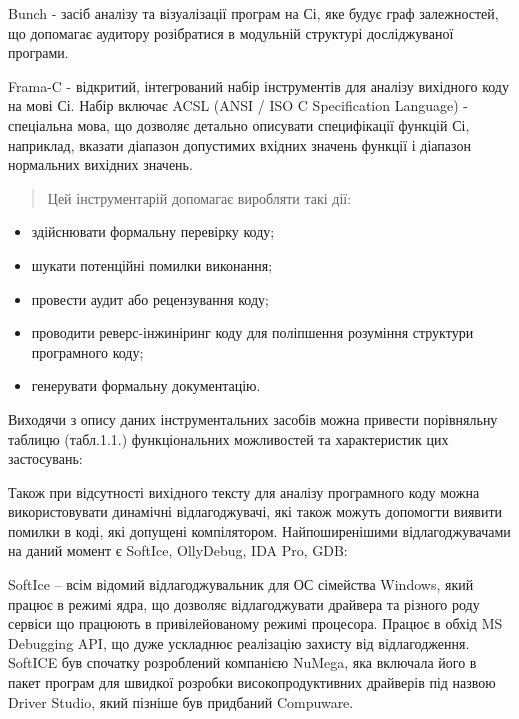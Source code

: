 Bunch - засіб аналізу та візуалізації програм на Сі, яке будує граф залежностей, що допомагає аудитору розібратися в модульній структурі досліджуваної програми.

Frama-C - відкритий, інтегрований набір інструментів для аналізу вихідного коду на мові Сі. Набір включає ACSL (ANSI / ISO C Specification Language) - спеціальна мова, що дозволяє детально описувати специфікації функцій Сі, наприклад, вказати діапазон допустимих вхідних значень функції і діапазон нормальних вихідних значень.
\begin{quote}

Цей інструментарій допомагає виробляти такі дії:
\end{quote}
\begin{itemize}
\item {} 
здійснювати формальну перевірку коду;

\item {} 
шукати потенційні помилки виконання;

\item {} 
провести аудит або рецензування коду;

\item {} 
проводити реверс-інжиніринг коду для поліпшення розуміння структури програмного коду;

\item {} 
генерувати формальну документацію.

\end{itemize}

Виходячи з опису даних інструментальних засобів можна привести порівняльну таблицю (табл.1.1.) функціональних можливостей та характеристик цих застосувань:

Також при відсутності вихідного тексту для аналізу програмного коду можна використовувати динамічні відлагоджувачі, які також можуть допомогти виявити помилки в коді, які допущені компілятором.
Найпоширенішими відлагоджувачами на даний момент є SoftIce, OllyDebug, IDA Pro, GDB:

SoftIce – всім відомий відлагоджувальник для ОС сімейства Windows, який працює в режимі ядра, що дозволяє відлагоджувати драйвера та різного роду сервіси що працюють в привілейованому режимі процесора. Працює в обхід MS Debugging API, що дуже ускладнює реалізацію захисту від відлагодження. SoftICE  був спочатку розроблений компанією NuMega, яка включала його в пакет програм для швидкої розробки високопродуктивних драйверів під назвою Driver Studio, який пізніше був придбаний Compuware.

